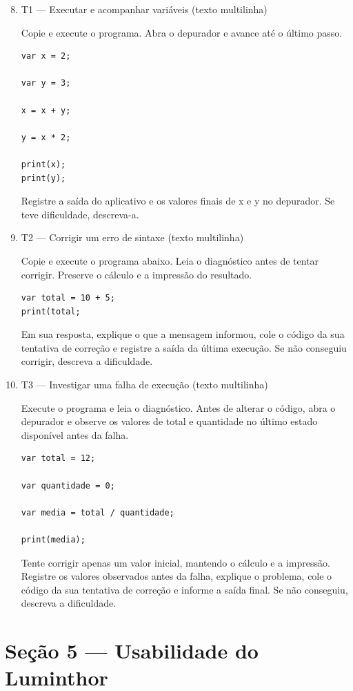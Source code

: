 \begin{enumerate}
\setcounter{enumi}{7}
\item T1 --- Executar e acompanhar variáveis (texto multilinha)

Copie e execute o programa. Abra o depurador e avance até o último passo.
\begin{lstlisting}[language={},numbers=none]
var x = 2;

var y = 3;

x = x + y;

y = x * 2;

print(x);
print(y);
\end{lstlisting}
Registre a saída do aplicativo e os valores finais de x e y no depurador. Se teve
dificuldade, descreva-a.

\item T2 --- Corrigir um erro de sintaxe (texto multilinha)

Copie e execute o programa abaixo. Leia o diagnóstico antes de tentar corrigir.
Preserve o cálculo e a impressão do resultado.
\begin{lstlisting}[language={},numbers=none]
var total = 10 + 5;
print(total;
\end{lstlisting}
Em sua resposta, explique o que a mensagem informou, cole o código da sua tentativa
de correção e registre a saída da última execução. Se não conseguiu corrigir,
descreva a dificuldade.

\item T3 --- Investigar uma falha de execução (texto multilinha)

Execute o programa e leia o diagnóstico. Antes de alterar o código, abra o depurador
e observe os valores de total e quantidade no último estado disponível antes da falha.
\begin{lstlisting}[language={},numbers=none]
var total = 12;

var quantidade = 0;

var media = total / quantidade;

print(media);
\end{lstlisting}
Tente corrigir apenas um valor inicial, mantendo o cálculo e a impressão. Registre os
valores observados antes da falha, explique o problema, cole o código da sua tentativa
de correção e informe a saída final. Se não conseguiu, descreva a dificuldade.
\end{enumerate}

\section*{Seção 5 --- Usabilidade do Luminthor}

